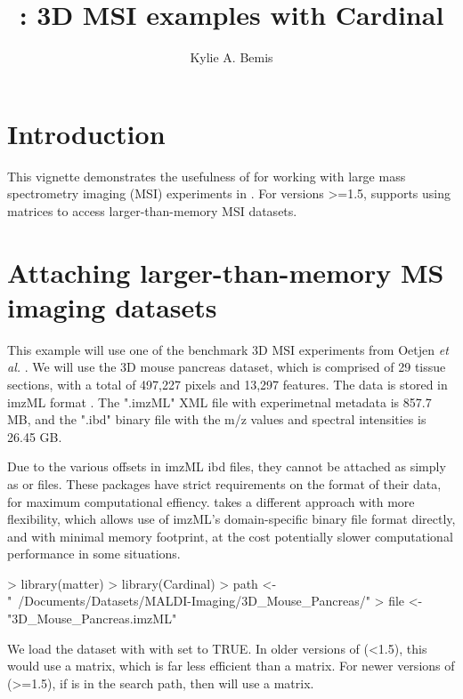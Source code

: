 \documentclass[a4paper]{article}
\title{\Rpackage{matter}: 3D MSI examples with Cardinal}
\author{Kylie A. Bemis}
\begin{document}


\maketitle

\tableofcontents

\section{Introduction}

This vignette demonstrates the usefulness of  for working with large mass spectrometry imaging (MSI) experiments in . For versions >=1.5,  supports using  matrices to access larger-than-memory MSI datasets.


\section{Attaching larger-than-memory MS imaging datasets}

This example will use one of the benchmark 3D MSI experiments from Oetjen {\it et al.} \cite{Oetjen:2015en}. We will use the 3D mouse pancreas dataset, which is comprised of 29 tissue sections, with a total of 497,227 pixels and 13,297 features. The data is stored in imzML format \cite{Schramm}. The ".imzML" XML file with experimetnal metadata is 857.7 MB, and the ".ibd" binary file with the m/z values and spectral intensities is 26.45 GB.

Due to the various offsets in imzML ibd files, they cannot be attached as simply as  or  files. These packages have strict requirements on the format of their data, for maximum computational effiency.  takes a different approach with more flexibility, which allows use of imzML's domain-specific binary file format directly, and with minimal memory footprint, at the cost potentially slower computational performance in some situations.

\begin{Schunk}
\begin{Sinput}
> library(matter)
> library(Cardinal)
> path <- "~/Documents/Datasets/MALDI-Imaging/3D_Mouse_Pancreas/"
> file <- "3D_Mouse_Pancreas.imzML"
\end{Sinput}
\end{Schunk}


We load the dataset with  with  set to TRUE. In older versions of  (<1.5), this would use a  matrix, which is far less efficient than a  matrix. For newer versions of  (>=1.5), if  is in the search path, then  will use a  matrix.
\end{document}
